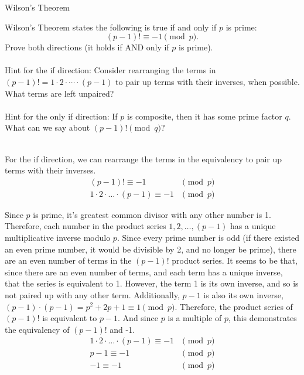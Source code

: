 \begin{homeworkProblem}{Wilson's Theorem}

    Wilson's Theorem states the following is true if and only if $p$ is prime:
    \[(p - 1)! \equiv -1 \pmod{p}.\]
    Prove both directions (it holds if AND only if $p$ is prime).
    \\ \\
    Hint for the if direction: Consider rearranging the terms in $(p - 1)! = 1 
    \cdot 2 \cdot \cdots \cdot (p - 1)$ to pair up terms with their inverses, when 
    possible. What terms are left unpaired?
    \\ \\
    Hint for the only if direction: If $p$ is composite, then it has some prime 
    factor $q$.  What can we say about $(p-1)! \pmod{q}$?
    \\ \\
    \solution 

    For the if direction, we can rearrange the terms in the equivalency to pair up 
    terms with their inverses. 
    \[
        \begin{split}
            (p - 1)! \equiv -1 & \pmod{p} \\
            1 \cdot 2 \cdot \dots \cdot (p -1 ) \equiv -1 & \pmod{p}
        \end{split}
    \]
    
    Since $p$ is prime, it's greatest common divisor with any other number is 1. 
    Therefore, each number in the product series $1, 2, \dots, (p-1)$ has a unique 
    multiplicative inverse modulo $p$. Since every prime number is odd (if there 
    existed an even prime number, it would be divisible by 2, and no longer be 
    prime), there are an even number of terms in the $(p-1)!$ product series. It 
    seems to be that, since there are an even number of terms, and each term has 
    a unique inverse, that the series is equivalent to 1. However, the term 1 is 
    its own inverse, and so is not paired up with any other term. Additionally,
    $p-1$ is also its own inverse, $(p-1) \cdot (p-1) = p^2 + 2p + 1 \equiv 1
    \pmod{p}$. Therefore, the product series of $(p-1)!$ is equivalent to $p-1$.
    And since $p$ is a multiple of $p$, this demonstrates the equivalency of $(p-1)!$
    and -1. 
    \[
        \begin{split}
            1 \cdot 2 \cdot \dots \cdot (p -1 ) \equiv -1 & \pmod{p} \\
            p-1 \equiv -1 & \pmod{p} \\
            -1 \equiv -1 & \pmod{p} \\
        \end{split}
    \]


\end{homeworkProblem}

